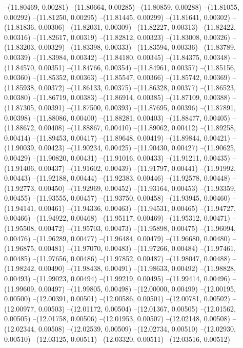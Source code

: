 --(11.80469, 0.00281)
--(11.80664, 0.00285)
--(11.80859, 0.00288)
--(11.81055, 0.00292)
--(11.81250, 0.00295)
--(11.81445, 0.00299)
--(11.81641, 0.00302)
--(11.81836, 0.00306)
--(11.82031, 0.00309)
--(11.82227, 0.00313)
--(11.82422, 0.00316)
--(11.82617, 0.00319)
--(11.82812, 0.00323)
--(11.83008, 0.00326)
--(11.83203, 0.00329)
--(11.83398, 0.00333)
--(11.83594, 0.00336)
--(11.83789, 0.00339)
--(11.83984, 0.00342)
--(11.84180, 0.00345)
--(11.84375, 0.00348)
--(11.84570, 0.00351)
--(11.84766, 0.00354)
--(11.84961, 0.00357)
--(11.85156, 0.00360)
--(11.85352, 0.00363)
--(11.85547, 0.00366)
--(11.85742, 0.00369)
--(11.85938, 0.00372)
--(11.86133, 0.00375)
--(11.86328, 0.00377)
--(11.86523, 0.00380)
--(11.86719, 0.00383)
--(11.86914, 0.00385)
--(11.87109, 0.00388)
--(11.87305, 0.00391)
--(11.87500, 0.00393)
--(11.87695, 0.00396)
--(11.87891, 0.00398)
--(11.88086, 0.00400)
--(11.88281, 0.00403)
--(11.88477, 0.00405)
--(11.88672, 0.00408)
--(11.88867, 0.00410)
--(11.89062, 0.00412)
--(11.89258, 0.00414)
--(11.89453, 0.00417)
--(11.89648, 0.00419)
--(11.89844, 0.00421)
--(11.90039, 0.00423)
--(11.90234, 0.00425)
--(11.90430, 0.00427)
--(11.90625, 0.00429)
--(11.90820, 0.00431)
--(11.91016, 0.00433)
--(11.91211, 0.00435)
--(11.91406, 0.00437)
--(11.91602, 0.00439)
--(11.91797, 0.00441)
--(11.91992, 0.00443)
--(11.92188, 0.00444)
--(11.92383, 0.00446)
--(11.92578, 0.00448)
--(11.92773, 0.00450)
--(11.92969, 0.00452)
--(11.93164, 0.00453)
--(11.93359, 0.00455)
--(11.93555, 0.00457)
--(11.93750, 0.00458)
--(11.93945, 0.00460)
--(11.94141, 0.00461)
--(11.94336, 0.00463)
--(11.94531, 0.00465)
--(11.94727, 0.00466)
--(11.94922, 0.00468)
--(11.95117, 0.00469)
--(11.95312, 0.00471)
--(11.95508, 0.00472)
--(11.95703, 0.00473)
--(11.95898, 0.00475)
--(11.96094, 0.00476)
--(11.96289, 0.00477)
--(11.96484, 0.00479)
--(11.96680, 0.00480)
--(11.96875, 0.00481)
--(11.97070, 0.00483)
--(11.97266, 0.00484)
--(11.97461, 0.00485)
--(11.97656, 0.00486)
--(11.97852, 0.00487)
--(11.98047, 0.00488)
--(11.98242, 0.00490)
--(11.98438, 0.00491)
--(11.98633, 0.00492)
--(11.98828, 0.00493)
--(11.99023, 0.00494)
--(11.99219, 0.00495)
--(11.99414, 0.00496)
--(11.99609, 0.00497)
--(11.99805, 0.00498)
--(12.00000, 0.00499)
--(12.00195, 0.00500)
--(12.00391, 0.00501)
--(12.00586, 0.00501)
--(12.00781, 0.00502)
--(12.00977, 0.00503)
--(12.01172, 0.00504)
--(12.01367, 0.00505)
--(12.01562, 0.00505)
--(12.01758, 0.00506)
--(12.01953, 0.00507)
--(12.02148, 0.00508)
--(12.02344, 0.00508)
--(12.02539, 0.00509)
--(12.02734, 0.00510)
--(12.02930, 0.00510)
--(12.03125, 0.00511)
--(12.03320, 0.00511)
--(12.03516, 0.00512)
